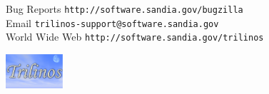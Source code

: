 \documentclass[11pt,twoside,titlepage]{TrilinosDoc}
\begin{document}
\label{Contacts}
Bug Reports \hfill \texttt{http://software.sandia.gov/bugzilla} \\
Email \hfill \texttt{trilinos-support@software.sandia.gov} \\
World Wide Web \hfill \texttt{http://software.sandia.gov/trilinos}

\vspace*{\fill}
\includegraphics[height=0.5in]{trilinos.eps}
\hfill

\cleardoublepage
\tableofcontents

\cleardoublepage
\listoffigures

\cleardoublepage
\listoftables

\clearpage

%

\cleardoublepage
%
%

\cleardoublepage
\printindex
%
\end{document}
